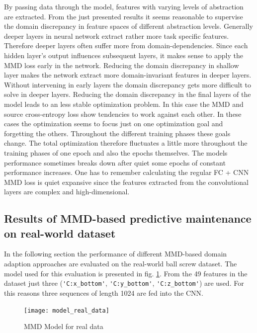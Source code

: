 By passing data through the model, features with varying levels of abstraction are extracted. From the just presented results it seems reasonable to supervise the domain discrepancy in feature spaces of different abstraction levels. Generally deeper layers in neural network extract rather more task specific features. Therefore deeper layers often suffer more from domain-dependencies. Since each hidden layer's output influences subsequent layers, it makes sense to apply the MMD loss early in the network. Reducing the domain discrepancy in shallow layer makes the network extract more domain-invariant features in deeper layers. Without intervening in early layers the domain discrepancy gets more difficult to solve in deeper layers. Reducing the domain discrepancy in the final layers of the model leads to an less stable optimization problem. In this case the MMD and source cross-entropy loss show tendencies to work against each other. In these cases the optimization seems to focus just on one optimization goal and forgetting the others. Throughout the different training phases these goals change. The total optimization therefore fluctuates a little more throughout the training phases of one epoch and also the epochs themselves. The models performance sometimes breaks down after quiet some epochs of constant performance increases. One has to remember calculating the regular FC + CNN MMD loss is quiet expansive since the features extracted from the convolutional layers are complex and high-dimensional.



\subsection{Results of MMD-based predictive maintenance on real-world dataset}
In the following section the performance of different MMD-based domain adaption approaches are evaluated on the real-world ball screw dataset. The model used for this evaluation is presented in fig. \ref{fig:model_real_data}. From the 49 features in the dataset just three (\verb|'C:x_bottom'|, \verb|'C:y_bottom'|, \verb|'C:z_bottom'|) are used. For this reasons three sequences of length 1024 are fed into the CNN.

\begin{figure}[htpb]
  \centering
  \texttt{[image: model\_real\_data]}
  \caption {MMD Model for real data} \label{fig:model_real_data}
\end{figure}

